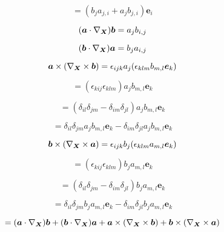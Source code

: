 \documentclass[preprint,12pt,authoryear]{elsarticle}
\begin{document}
\begin{equation*}
    = (b_j a_{j,i} + a_j b_{j,i}) \bm{e}_i
\end{equation*}

\bigskip

\begin{equation*}
    (\bm{a} \cdot \nabla_{\bm{X}}) \bm{b} = a_j b_{i,j}
\end{equation*}

\begin{equation*}
    (\bm{b} \cdot \nabla_{\bm{X}}) \bm{a} = b_j a_{i,j}
\end{equation*}

\begin{equation*}
    \bm{a} \times (\nabla_{\bm{X}} \times \bm{b}) = \epsilon_{ijk} a_j (\epsilon_{klm} b_{m,l} \bm{e}_k)
\end{equation*}

\begin{equation*}
    = (\epsilon_{kij} \epsilon_{klm}) a_j b_{m,l} \bm{e}_k
\end{equation*}

\begin{equation*}
    = (\delta_{il} \delta_{jm} - \delta_{im} \delta_{jl}) a_j b_{m,l} \bm{e}_k
\end{equation*}

\begin{equation*}
    = \delta_{il} \delta_{jm} a_j b_{m,l} \bm{e}_k - \delta_{im} \delta_{jl} a_j b_{m,l} \bm{e}_k
\end{equation*}

\begin{equation*}
    \bm{b} \times (\nabla_{\bm{X}} \times \bm{a}) = \epsilon_{ijk} b_j (\epsilon_{klm} a_{m,l} \bm{e}_k)
\end{equation*}

\begin{equation*}
    = (\epsilon_{kij} \epsilon_{klm}) b_j a_{m,l} \bm{e}_k
\end{equation*}

\begin{equation*}
    = (\delta_{il} \delta_{jm} - \delta_{im} \delta_{jl}) b_j a_{m,l} \bm{e}_k
\end{equation*}

\begin{equation*}
    = \delta_{il} \delta_{jm} b_j a_{m,l} \bm{e}_k - \delta_{im} \delta_{jl} b_j a_{m,l} \bm{e}_k
\end{equation*}




\begin{equation*}
    = (\bm{a} \cdot \nabla_{\bm{X}}) \bm{b} + (\bm{b} \cdot \nabla_{\bm{X}}) \bm{a} + \bm{a} \times (\nabla_{\bm{X}} \times \bm{b}) + \bm{b} \times (\nabla_{\bm{X}} \times \bm{a})
\end{equation*}
\end{document}
